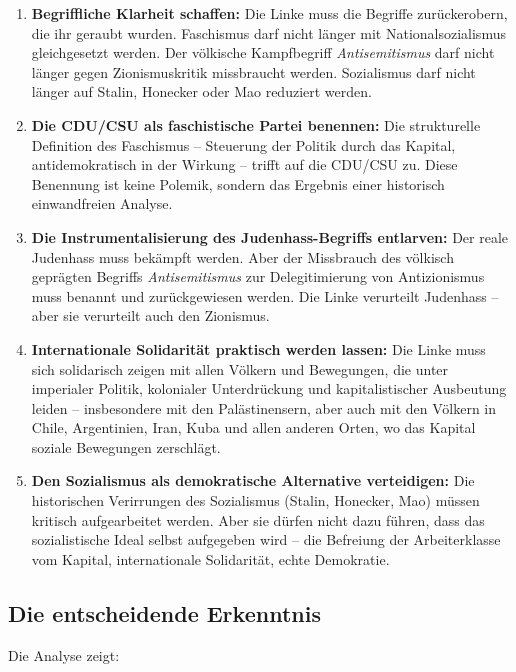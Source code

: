 \begin{enumerate}
    \item \textbf{Begriffliche Klarheit schaffen:} Die Linke muss die Begriffe zurückerobern, die ihr geraubt wurden. Faschismus darf nicht länger mit Nationalsozialismus gleichgesetzt werden. Der völkische Kampfbegriff \emph{Antisemitismus} darf nicht länger gegen Zionismuskritik missbraucht werden. Sozialismus darf nicht länger auf Stalin, Honecker oder Mao reduziert werden.
    
    \item \textbf{Die CDU/CSU als faschistische Partei benennen:} Die strukturelle Definition des Faschismus – Steuerung der Politik durch das Kapital, antidemokratisch in der Wirkung – trifft auf die CDU/CSU zu. Diese Benennung ist keine Polemik, sondern das Ergebnis einer historisch einwandfreien Analyse.
    
    \item \textbf{Die Instrumentalisierung des Judenhass-Begriffs entlarven:} Der reale Judenhass muss bekämpft werden. Aber der Missbrauch des völkisch geprägten Begriffs \emph{Antisemitismus} zur Delegitimierung von Antizionismus muss benannt und zurückgewiesen werden. Die Linke verurteilt Judenhass – aber sie verurteilt auch den Zionismus.
    
    \item \textbf{Internationale Solidarität praktisch werden lassen:} Die Linke muss sich solidarisch zeigen mit allen Völkern und Bewegungen, die unter imperialer Politik, kolonialer Unterdrückung und kapitalistischer Ausbeutung leiden – insbesondere mit den Palästinensern, aber auch mit den Völkern in Chile, Argentinien, Iran, Kuba und allen anderen Orten, wo das Kapital soziale Bewegungen zerschlägt.
    
    \item \textbf{Den Sozialismus als demokratische Alternative verteidigen:} Die historischen Verirrungen des Sozialismus (Stalin, Honecker, Mao) müssen kritisch aufgearbeitet werden. Aber sie dürfen nicht dazu führen, dass das sozialistische Ideal selbst aufgegeben wird – die Befreiung der Arbeiterklasse vom Kapital, internationale Solidarität, echte Demokratie.
\end{enumerate}

\subsection{Die entscheidende Erkenntnis}

Die Analyse zeigt:

